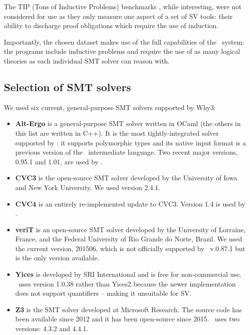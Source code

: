The TIP (Tons of Inductive Problems) benchmarks \cite{Claessen2015}, while interesting, were not considered for use as they only measure one aspect of a set of SV tools: their ability to discharge proof obligations which require the use of induction. 

Importantly, the chosen dataset makes use of the full capabilities of the \why~system: the programs include inductive problems and require the use of as many logical theories as each individual SMT solver can reason with.   

\subsection{Selection of \textsc{SMT} solvers}
\label{sub:smtselection}

We used six current, general-purpose SMT solvers supported by \textsf{Why3}: 
\begin{itemize}
	\item \textbf{Alt-Ergo} is a general-purpose SMT solver written in OCaml (the others in this list are written in C++). It is the most tightly-integrated solver supported by \why: it supports polymorphic types and its native input format is a previous version of the \why~intermediate language. Two recent major versions, 0.95.1 and 1.01, are used by \where.
	\item \textbf{CVC3} is the open-source SMT solver developed by the University of Iowa and New York University. We used version 2.4.1.
	\item \textbf{CVC4} is an entirely re-implemented update to CVC3. Version 1.4 is used by \where.
	\item \textbf{veriT} is an open-source SMT solver developed by the University of Lorraine, France, and the Federal University of Rio Grande do Norte, Brazil. We used the current version, 201506, which is not officially supported by \why~v.0.87.1 but is the only version available.
	\item \textbf{Yices} is developed by SRI International and is free for non-commercial use. \where~uses version 1.0.38 rather than Yices2 because the newer implementation does not support quantifiers -- making it unsuitable for SV.  
	\item \textbf{Z3} is the SMT solver developed at Microsoft Research. The source code has been available since 2012 and it has been open-source since 2015. \where~uses two versions: 4.3.2 and 4.4.1. 
\end{itemize}

